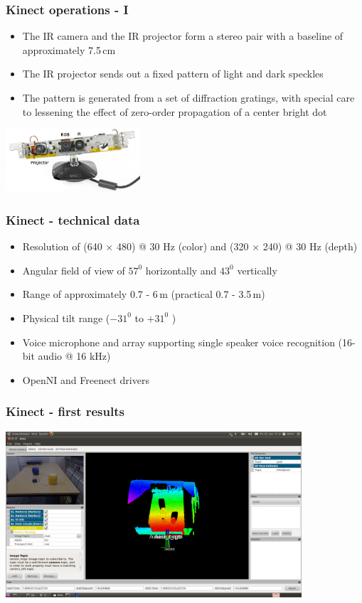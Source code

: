 \begin{frame}
 \frametitle{Kinect operations - I}

\begin{itemize}
  \item The IR camera and the IR projector form a stereo pair with a baseline of approximately 7.5\,cm
  \item The IR projector sends out a fixed pattern of light and dark speckles
  \item The pattern is generated from a set of diffraction gratings, with special care to lessening the effect of zero-order propagation of a center bright dot
\end{itemize}
\hspace{35ex}\includegraphics[width=5cm]{img/kinect2.png} 
\end{frame}

\begin{frame}
 \frametitle{Kinect - technical data}
\begin{itemize}
  \item Resolution of (640 $\times$ 480) @ 30 Hz (color) and (320 $\times$ 240) @ 30 Hz (depth)
  \item Angular field of view of $57^0$ horizontally and $43^0$ vertically
  \item Range of approximately 0.7 - 6\,m (practical 0.7 - 3.5\,m)
  \item Physical tilt range ($-31^0$  to $+31^0$ )
  \item Voice microphone and array supporting single speaker voice recognition (16-bit audio @ 16 kHz)
  \item OpenNI and Freenect drivers
\end{itemize}

\end{frame}


\begin{frame} 
 \frametitle{Kinect - first results}
\includegraphics[width=11cm]{img/ros_rviz.png}
\end{frame}


